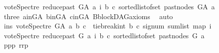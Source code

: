 \begin{isabellebody}
\ {\isacharparenleft}{\kern0pt}vote{\isacharunderscore}{\kern0pt}Spectre\ {\isacharparenleft}{\kern0pt}reduce{\isacharunderscore}{\kern0pt}past\ G{\isacharunderscore}{\kern0pt}A\ a{\isacharparenright}{\kern0pt}\ i\ b\ c{\isacharparenright}{\kern0pt}{\isacharparenright}{\kern0pt}\ {\isacharparenleft}{\kern0pt}sorted{\isacharunderscore}{\kern0pt}list{\isacharunderscore}{\kern0pt}of{\isacharunderscore}{\kern0pt}set\ {\isacharparenleft}{\kern0pt}past{\isacharunderscore}{\kern0pt}nodes\ G{\isacharunderscore}{\kern0pt}A\ a{\isacharparenright}{\kern0pt}{\isacharparenright}{\kern0pt}{\isacharparenright}{\kern0pt}{\isacharparenright}{\kern0pt}{\isacharparenright}{\kern0pt}{\isacharparenright}{\kern0pt}{\isachardoublequoteclose}\isanewline
\ \ \ \ \ \ \isamarkupfalse%
\ three\ a{\isacharunderscore}{\kern0pt}in{\isacharunderscore}{\kern0pt}G{\isacharunderscore}{\kern0pt}A\ b{\isacharunderscore}{\kern0pt}in{\isacharunderscore}{\kern0pt}G{\isacharunderscore}{\kern0pt}A\ c{\isacharunderscore}{\kern0pt}in{\isacharunderscore}{\kern0pt}G{\isacharunderscore}{\kern0pt}A\ B{}{\isachardot}{\kern0pt}blockDAG{\isacharunderscore}{\kern0pt}axioms\ \isamarkupfalse%
\ auto\isanewline
\ \ \ \ \isamarkupfalse%
\ \isamarkupfalse%
\ ins{\isacharunderscore}{\kern0pt}{}{\isacharcolon}{\kern0pt}\ {\isachardoublequoteopen}vote{\isacharunderscore}{\kern0pt}Spectre\ G{\isacharunderscore}{\kern0pt}A\ a\ b\ c\ {\isacharequal}{\kern0pt}\ {\isacharparenleft}{\kern0pt}tie{\isacharunderscore}{\kern0pt}break{\isacharunderscore}{\kern0pt}int\ b\ c\ {\isacharparenleft}{\kern0pt}signum\ {\isacharparenleft}{\kern0pt}sum{\isacharunderscore}{\kern0pt}list\ {\isacharparenleft}{\kern0pt}map\ {\isacharparenleft}{\kern0pt}{\isasymlambda}i{\isachardot}{\kern0pt}\isanewline
\ {\isacharparenleft}{\kern0pt}vote{\isacharunderscore}{\kern0pt}Spectre\ {\isacharparenleft}{\kern0pt}reduce{\isacharunderscore}{\kern0pt}past\ G\ a{\isacharparenright}{\kern0pt}\ i\ b\ c{\isacharparenright}{\kern0pt}{\isacharparenright}{\kern0pt}\ {\isacharparenleft}{\kern0pt}sorted{\isacharunderscore}{\kern0pt}list{\isacharunderscore}{\kern0pt}of{\isacharunderscore}{\kern0pt}set\ {\isacharparenleft}{\kern0pt}past{\isacharunderscore}{\kern0pt}nodes\ G\ a{\isacharparenright}{\kern0pt}{\isacharparenright}{\kern0pt}{\isacharparenright}{\kern0pt}{\isacharparenright}{\kern0pt}{\isacharparenright}{\kern0pt}{\isacharparenright}{\kern0pt}{\isachardoublequoteclose}\isanewline
\ \ \ \ \ \ \isamarkupfalse%
\ ppp\ rrp\ \isamarkupfalse%

\end{isabellebody}
